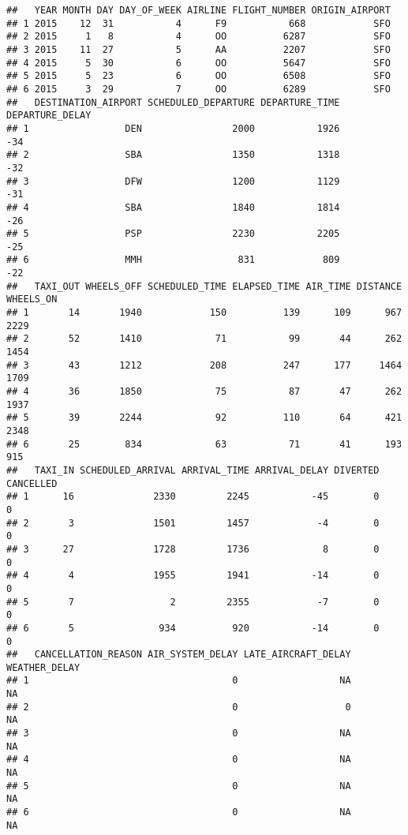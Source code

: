 \documentclass[
]{article}
\begin{document}
\begin{verbatim}
##   YEAR MONTH DAY DAY_OF_WEEK AIRLINE FLIGHT_NUMBER ORIGIN_AIRPORT
## 1 2015    12  31           4      F9           668            SFO
## 2 2015     1   8           4      OO          6287            SFO
## 3 2015    11  27           5      AA          2207            SFO
## 4 2015     5  30           6      OO          5647            SFO
## 5 2015     5  23           6      OO          6508            SFO
## 6 2015     3  29           7      OO          6289            SFO
##   DESTINATION_AIRPORT SCHEDULED_DEPARTURE DEPARTURE_TIME DEPARTURE_DELAY
## 1                 DEN                2000           1926             -34
## 2                 SBA                1350           1318             -32
## 3                 DFW                1200           1129             -31
## 4                 SBA                1840           1814             -26
## 5                 PSP                2230           2205             -25
## 6                 MMH                 831            809             -22
##   TAXI_OUT WHEELS_OFF SCHEDULED_TIME ELAPSED_TIME AIR_TIME DISTANCE WHEELS_ON
## 1       14       1940            150          139      109      967      2229
## 2       52       1410             71           99       44      262      1454
## 3       43       1212            208          247      177     1464      1709
## 4       36       1850             75           87       47      262      1937
## 5       39       2244             92          110       64      421      2348
## 6       25        834             63           71       41      193       915
##   TAXI_IN SCHEDULED_ARRIVAL ARRIVAL_TIME ARRIVAL_DELAY DIVERTED CANCELLED
## 1      16              2330         2245           -45        0         0
## 2       3              1501         1457            -4        0         0
## 3      27              1728         1736             8        0         0
## 4       4              1955         1941           -14        0         0
## 5       7                 2         2355            -7        0         0
## 6       5               934          920           -14        0         0
##   CANCELLATION_REASON AIR_SYSTEM_DELAY LATE_AIRCRAFT_DELAY WEATHER_DELAY
## 1                                    0                  NA            NA
## 2                                    0                   0            NA
## 3                                    0                  NA            NA
## 4                                    0                  NA            NA
## 5                                    0                  NA            NA
## 6                                    0                  NA            NA
\end{verbatim}
\end{document}
